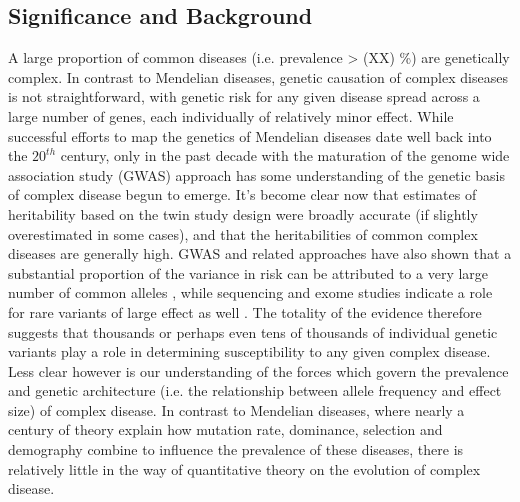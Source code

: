 \documentclass[11pt]{article}
\newcommand{\jb}[1]{{\color{blue} (#1)} }
\begin{document}
\subsection*{Significance and Background}

A large proportion of common diseases (i.e. prevalence > \jb{XX}\%) are genetically complex. In contrast to Mendelian diseases, genetic causation of complex diseases is not straightforward, with genetic risk for any given disease spread across a large number of genes, each individually of relatively minor effect. While successful efforts to map the genetics of Mendelian diseases date well back into the $20^{th}$ century, only in the past decade with the maturation of the genome wide association study (GWAS) approach has some understanding of the genetic basis of complex disease begun to emerge\cite{Visscher:2012je,get_more}. It's become clear now that estimates of heritability based on the twin study design were broadly accurate (if slightly overestimated in some cases), and that the heritabilities of common complex diseases are generally high. GWAS and related approaches have also shown that a substantial proportion of the variance in risk can be attributed to a very large number of common alleles \cite{Consortium:2009ef, Lee:2012iu,Loh:2015hz, Ripke:2014eb}, while sequencing and exome studies indicate a role for rare variants of large effect as well \cite{Richards:2016cs, Genovese:2016fv, Purcell:2014gw}. The totality of the evidence therefore suggests that thousands or perhaps even tens of thousands of individual genetic variants play a role in determining susceptibility to any given complex disease. Less clear however is our understanding of the forces which govern the prevalence and genetic architecture (i.e. the relationship between allele frequency and effect size) of complex disease. In contrast to Mendelian diseases, where nearly a century of theory explain how mutation rate, dominance, selection \cite{Patil:2010ha} and demography \cite{HurlesText} combine to influence the prevalence of these diseases, there is relatively little in the way of quantitative theory on the evolution of complex disease. 

\end{document}
